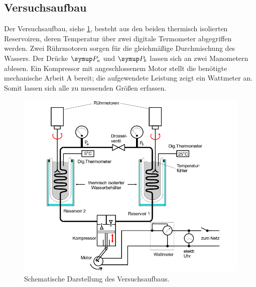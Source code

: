 \subsection{Versuchsaufbau}
Der Versuchsaufbau, siehe \ref{fig:1}, besteht aus den beiden thermisch isolierten Reservoiren, deren Temperatur über zwei
digitale Termometer abgegriffen werden. Zwei Rührmotoren sorgen für die gleichmäßige Durchmischung des Wassers.
Der Drücke $\symup P_a$ und $\symup P_b$ lassen sich an zwei Manometern ablesen. Ein Kompressor
mit angeschlossenem Motor stellt die benötigte mechanische Arbeit A bereit; die aufgewendete Leistung zeigt
ein Wattmeter an. Somit lassen sich alle zu messenden Größen erfassen.
\begin{figure}
  \centering
  \includegraphics[scale=0.5]{schema.png}
  \caption{Schematische Darstellung des Versuchsaufbaus.}
  \label{fig:1}
\end{figure}
